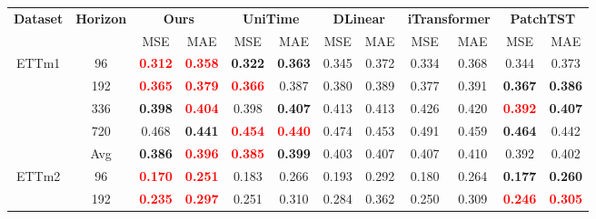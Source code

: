 
\begin{table}[!htbp]
\centering
\small
\setlength{\tabcolsep}{3.6pt}
\renewcommand{\arraystretch}{0.96}
\label{tab:chap4-main-results-b}
\begin{tabular}{c|c|cc|cc|cc|cc|cc}
\toprule
\multirow{2}{*}{\textbf{Dataset}} & \multirow{2}{*}{\textbf{Horizon}} &
\multicolumn{2}{c|}{\textbf{Ours}} &
\multicolumn{2}{c|}{\textbf{UniTime}} &
\multicolumn{2}{c|}{\textbf{DLinear}} &
\multicolumn{2}{c|}{\textbf{iTransformer}} &
\multicolumn{2}{c}{\textbf{PatchTST}} \\
& & MSE & MAE & MSE & MAE & MSE & MAE & MSE & MAE & MSE & MAE \\
\midrule
\multirow{5}{*}{ETTm1}
& 96 & \textbf{\textcolor{red}{0.312}} & \textbf{\textcolor{red}{0.358}} & \textbf{0.322} & \textbf{0.363} & 0.345 & 0.372 & 0.334 & 0.368 & 0.344 & 0.373 \\
& 192 & \textbf{\textcolor{red}{0.365}} & \textbf{\textcolor{red}{0.379}} & \textbf{\textcolor{red}{0.366}} & 0.387 & 0.380 & 0.389 & 0.377 & 0.391 & \textbf{0.367} & \textbf{0.386} \\
& 336 & \textbf{0.398} & \textbf{\textcolor{red}{0.404}} & 0.398 & \textbf{0.407} & 0.413 & 0.413 & 0.426 & 0.420 & \textbf{\textcolor{red}{0.392}} & \textbf{0.407} \\
& 720 & 0.468 & \textbf{0.441} & \textbf{\textcolor{red}{0.454}} & \textbf{\textcolor{red}{0.440}} & 0.474 & 0.453 & 0.491 & 0.459 & \textbf{0.464} & 0.442 \\
& Avg & \textbf{0.386} & \textbf{\textcolor{red}{0.396}} & \textbf{\textcolor{red}{0.385}} & \textbf{0.399} & 0.403 & 0.407 & 0.407 & 0.410 & 0.392 & 0.402 \\
\midrule
\multirow{5}{*}{ETTm2}
& 96 & \textbf{\textcolor{red}{0.170}} & \textbf{\textcolor{red}{0.251}} & 0.183 & 0.266 & 0.193 & 0.292 & 0.180 & 0.264 & \textbf{0.177} & \textbf{0.260} \\
& 192 & \textbf{\textcolor{red}{0.235}} & \textbf{\textcolor{red}{0.297}} & 0.251 & 0.310 & 0.284 & 0.362 & 0.250 & 0.309 & \textbf{\textcolor{red}{0.246}} & \textbf{\textcolor{red}{0.305}} \\

\end{tabular}
\end{table}
